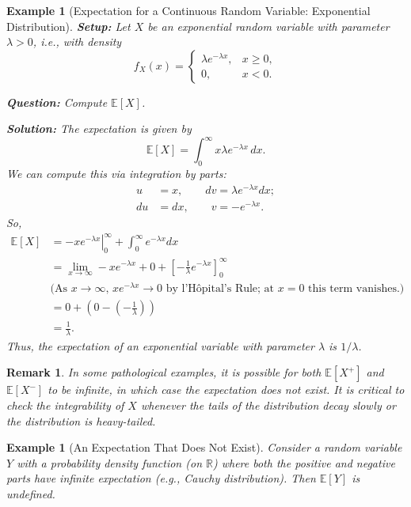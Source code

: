 \documentclass[12pt]{article}
\newtheorem{example}[definition]{Example}
\newtheorem{remark}[definition]{Remark}
\begin{document}
\begin{example}[Expectation for a Continuous Random Variable: Exponential Distribution]
    \label{ex:exponential_expectation}
    \textbf{Setup:} Let $X$ be an exponential random variable with parameter $\lambda > 0$, i.e., with density
    \[
    f_X(x) = \begin{cases}
        \lambda e^{-\lambda x}, & x \geq 0,\\
        0, & x < 0.
    \end{cases}
    \]

    \textbf{Question:} Compute $\mathbb{E}[X]$.

    \textbf{Solution:}
    The expectation is given by
    \[
    \mathbb{E}[X] = \int_0^{\infty} x \lambda e^{-\lambda x} \, dx.
    \]
    We can compute this via integration by parts:
    \begin{align*}
    u &= x,\qquad dv = \lambda e^{-\lambda x} dx;\\
    du &= dx,\qquad v = -e^{-\lambda x}.
    \end{align*}
    So,
    \begin{align*}
        \mathbb{E}[X] &= \left. -x e^{-\lambda x} \right|_0^\infty + \int_0^\infty e^{-\lambda x} dx \\
        &= \lim_{x\to\infty} -x e^{-\lambda x} + 0 + \left[ -\frac{1}{\lambda} e^{-\lambda x} \right]_0^\infty \\
        & \text{(As $x\to\infty$, $x e^{-\lambda x} \to 0$ by l'Hôpital's Rule; at $x = 0$ this term vanishes.)} \\
        &= 0 + \left( 0 - \left(-\frac{1}{\lambda}\right) \right)\\
        &= \frac{1}{\lambda}.
    \end{align*}
    \emph{Thus, the expectation of an exponential variable with parameter $\lambda$ is $1/\lambda$.}
\end{example}

\medskip

\begin{remark}
    In some pathological examples, it is possible for both $\mathbb{E}[X^+]$ and $\mathbb{E}[X^-]$ to be infinite, in which case the expectation does not exist. It is critical to check the integrability of $X$ whenever the tails of the distribution decay slowly or the distribution is heavy-tailed.
\end{remark}

\begin{example}[An Expectation That Does Not Exist]
    Consider a random variable $Y$ with a probability density function (on $\mathbb{R}$) where both the positive and negative parts have infinite expectation (e.g., Cauchy distribution). Then $\mathbb{E}[Y]$ is \emph{undefined}.
\end{example}
\end{document}
